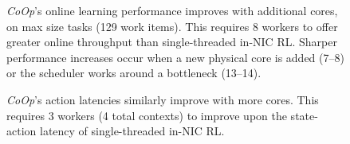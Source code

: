 \documentclass[
sigconf,natbib=false
]{acmart}
\newcommand{\Coopfw}{\emph{CoOp}}
\begin{document}
\begin{figure}[t]
	\caption{
		\Coopfw{}'s online learning performance improves with additional cores, on max size tasks (\num{129} work items). This requires \num{8} workers to offer greater online throughput than single-threaded in-NIC RL. Sharper performance increases occur when a new physical core is added (\numrange{7}{8}) or the scheduler works around a bottleneck (\numrange{13}{14}).\label{fig:vary-core}}
\end{figure}

\begin{figure}
	\caption{\Coopfw{}'s action latencies similarly improve with more cores. This requires \num{3} workers (4 total contexts) to improve upon the state-action latency of single-threaded in-NIC RL.\label{fig:vary-core-latency}}
\end{figure}
\end{document}
